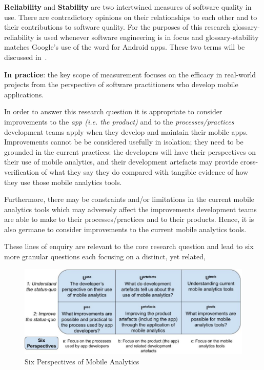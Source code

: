 \textbf{Reliability} and \textbf{Stability} are two intertwined measures of software quality in use. There are contradictory opinions on their relationships to each other and to their contributions to software quality. For the purposes of this research \gls{glossary-reliability} is used whenever software engineering is in focus and \gls{glossary-stability} matches Google's use of the word for Android apps. 
These two terms will be discussed in~. 
    
\textbf{In practice}: the key scope of measurement focuses on the efficacy in real-world projects from the perspective of software practitioners who develop mobile applications.

In order to answer this research question it is appropriate to consider improvements to the \emph{app (i.e. the product)} and to the \emph{processes/practices} development teams apply when they develop and maintain their mobile apps. Improvements cannot be be considered usefully in isolation; they need to be grounded in the current practices: the developers will have their perspectives on their use of mobile analytics, and their development artefacts may provide cross-verification of what they say they do compared with tangible evidence of how they use those mobile analytics tools. 

Furthermore, there may be constraints and/or limitations in the current mobile analytics tools which may adversely affect the improvements development teams are able to make to their processes/practices and to their products. Hence, it is also germane to consider improvements to the current mobile analytics tools.

These lines of enquiry are relevant to the core research question and lead to six more granular questions each focusing on a distinct, yet related, %

\begin{figure}
    \includegraphics[width=\linewidth]{images/my/six-perspectives-2x3-matrix-12-nov-2021.jpeg}
    \caption{Six Perspectives of Mobile Analytics}
    \label{fig:six-perspectives-in-the-research-questions-section}
\end{figure}

